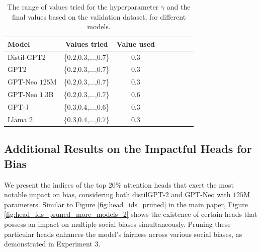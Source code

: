 \documentclass[letterpaper]{article} %
\begin{document}
\begin{table}[h]
\centering
\begin{tabular}{lcclllll}
\hline
 \textbf{Model} & \textbf{Values tried} & \textbf{Value used}\\
\hline
\centering

         Distil-GPT2        &  \{$0.2$,$0.3$,...,$0.7$\}    &$0.3$ &\\
         GPT2                &  \{$0.2$,$0.3$,...,$0.7$\}    &$0.3$ &\\
         GPT-Neo $125$M        &  \{$0.2$,$0.3$,...,$0.7$\}    &$0.3$ &\\
         GPT-Neo $1.3$B        &  \{$0.2$,$0.3$,...,$0.7$\}    &$0.6$ &\\
         GPT-J       &  \{$0.3$,$0.4$,...,$0.6$\}    &$0.3$ &\\
         Llama $2$          &  \{$0.3$,$0.4$,...,$0.7$\}    &$0.3$ &\\
         \hline

\end{tabular}
\caption{The range of values tried for the hyperparameter $\gamma $ and the final values based on the validation dataset, for different models.
}
\label{tab:hyperparamaters}
\end{table}





\subsection{Additional Results on the Impactful Heads for Bias}

We present the indices of the top $20\%$ attention heads that exert the most notable impact on bias, considering both distilGPT-2 and GPT-Neo with $125$M parameters. Similar to Figure \ref{fig:head_ids_pruned} in the main paper, Figure \ref{fig:head_ids_pruned_more_models_2} shows the existence of certain heads that possess an impact on multiple social biases simultaneously. Pruning these particular heads enhances the model's fairness across various social biases, as demonstrated in Experiment 3.
\end{document}
